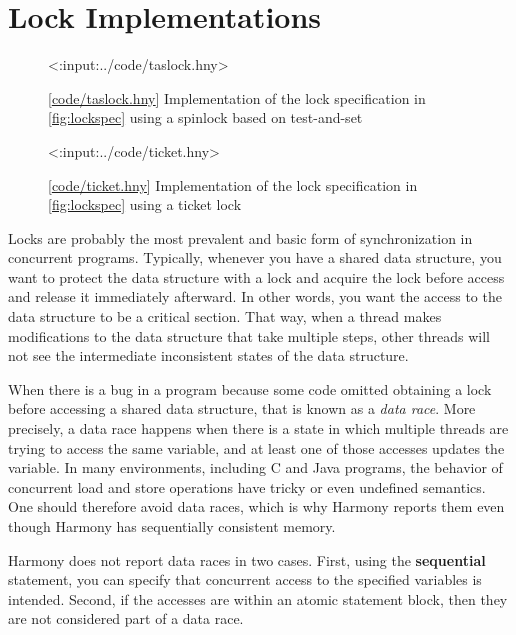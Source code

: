 \documentclass{report}
\newcommand{\harmonylink}[1]{%
[\href{https://harmony.cs.cornell.edu/#1}{\underline{#1}}]%
}
\newenvironment{code}{
\tcolorbox
}{
\endtcolorbox
}
\begin{document}
\chapter{Lock Implementations}
\label{ch:synch}
%
%

\begin{figure}
\begin{code}
<{:input:../code/taslock.hny}>
\end{code}
\caption{\harmonylink{code/taslock.hny} Implementation of the lock
specification in \autoref{fig:lockspec} using a spinlock based on
test-and-set}
\label{fig:tas2}
\end{figure}

\begin{figure}
\begin{code}
<{:input:../code/ticket.hny}>
\end{code}
\caption{\harmonylink{code/ticket.hny} Implementation of the lock
specification in \autoref{fig:lockspec} using a ticket lock}
\label{fig:ticket}
\end{figure}

Locks are probably the most prevalent and basic form of synchronization
in concurrent programs.  Typically, whenever you have a shared data
structure, you want to protect the data structure with a lock and
acquire the lock before access and release it immediately afterward.
In other words, you want the access to the data structure to be a
critical section.
That way, when a thread makes modifications to the data structure that take
multiple steps, other threads will not see the intermediate inconsistent
states of the data structure.

%
%
When there is a bug in a program because some code omitted obtaining
a lock before accessing a shared data structure, that is known as a
\emph{data race}.
More precisely, a data race happens when there is a state in which multiple
threads are trying to access the same variable, and at least one of those
accesses updates the variable.
In many environments, including C and Java programs, the behavior of
concurrent load and store operations have tricky or even undefined
semantics.  One should therefore avoid data races, which is why Harmony
reports them even though Harmony has sequentially consistent memory.

Harmony does not report data races in two cases.
First, using the \textbf{sequential} statement, you can specify that
concurrent access to the specified variables is intended.
Second, if the accesses are within an atomic statement block, then they
are not considered part of a data race.
\end{document}
